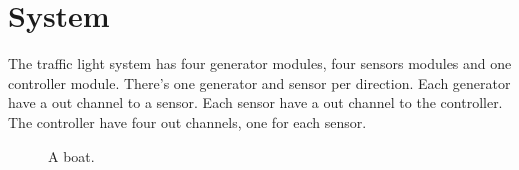 \section{System}
The traffic light system has four generator modules, four sensors modules and one controller module. There's one generator and sensor per direction. Each generator have a out channel to a sensor. Each sensor have a out channel to the controller. The controller have four out channels, one for each sensor.

\bigskip

\begin{figure}[h!]
  \caption{A boat.}
  \label{fig:boat1}
\end{figure}
